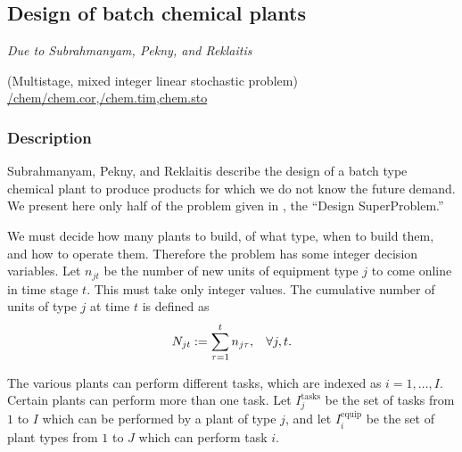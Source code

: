 \subsection{Design of batch chemical plants}%
\emph{Due to Subrahmanyam, Pekny, and Reklaitis \cite{subrahmanyam94}}%

\noindent(Multistage, mixed integer linear stochastic problem)\\
\noindent \url{/chem}\url{/chem.cor},\url{/chem.tim},\url{chem.sto}

\vspace{3mm}
\subsubsection{Description}
Subrahmanyam, Pekny, and Reklaitis \cite{subrahmanyam94} describe the design of a batch type chemical plant to produce products for which we do not know the future demand.  We present here only half of the problem given in  \cite{subrahmanyam94}, the ``Design SuperProblem.''  

We must decide how many plants to build, of what type, when to build them, and how to operate them.  Therefore the problem has some integer decision variables.  Let $n_{jt}$ be the number of new units of equipment type $j$ to come online in time stage $t$.  This must take only integer values.  The cumulative number of units of type $j$ at time $t$ is defined as
\begin{equation*}
N_{jt}:= \sum_{\tau = 1}^t n_{j\tau}, \hspace{3mm} \forall j,t.
\end{equation*}

The various plants can perform different tasks, which are indexed as $i=1,\ldots, I$.  Certain plants can perform more than one task.  Let $I_j^{\text{tasks}}$ be the set of tasks from $1$ to $I$ which can be performed by a plant of type $j$, and let $I_i^{\text{equip}}$ be the set of plant types from $1$ to $J$ which can perform task $i$.

